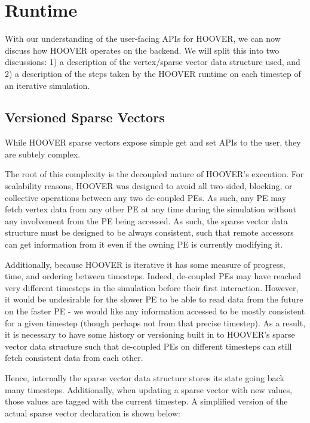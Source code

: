 \section{Runtime}

With our understanding of the user-facing APIs for HOOVER, we can now discuss
how HOOVER operates on the backend. We will split this into two discussions: 1)
a description of the vertex/sparse vector data structure used, and 2) a
description of the steps taken by the HOOVER runtime on each timestep of
an iterative simulation.

\subsection{Versioned Sparse Vectors}

While HOOVER sparse vectors expose simple get and set APIs to the user, they
are subtely complex.

The root of this complexity is the decoupled nature of HOOVER's execution. For
scalability reasons, HOOVER was designed to avoid all two-sided, blocking, or
collective operations between any two de-coupled PEs. As such, any PE may
fetch vertex data from any other PE at any time during the simulation without
any involvement from the PE being accessed. As such, the sparse vector data
structure must be designed to be always consistent, such that remote accessors
can get information from it even if the owning PE is currently modifying it.

Additionally, because HOOVER is iterative it has some measure of progress, time,
and ordering between timesteps. Indeed, de-coupled PEs may have
reached very different timesteps in the simulation before their first
interaction. However, it would be undesirable for the slower PE to be able to
read data from the future on the faster PE - we would like any information
accessed to be mostly consistent for a given timestep (though perhaps not from
that precise timestep). As a result, it is necessary to have some history or
versioning built in to HOOVER's sparse vector data structure such that
de-coupled PEs on different timesteps can still fetch consistent data from each
other.

Hence, internally the sparse vector data structure stores its state going back
many timesteps. Additionally, when updating a sparse vector with new values,
those values are tagged with the current timestep. A simplified version of the
actual sparse vector declaration is shown below:

